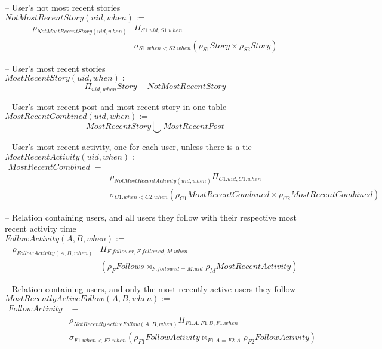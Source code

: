 \documentclass{article}
\newcommand{\var}[1]{\mathit{#1}}
\begin{document}
\begin{enumerate}
{-- User's not most recent stories \\ 
$\var{NotMostRecentStory}(uid, when) :=$
\begin{align*}
    \rho_{\var{NotMostRecentStory}(uid, when)}
    &\Pi_{S1.uid, S1.when}\\
    &\sigma_{S1.when < S2.when}
    \left( 
        \rho_{S1} \var{Story} \times \rho_{S2} \var{Story}
    \right)
\end{align*}

-- User's most recent stories \\ 
$\var{MostRecentStory}(uid, when) :=$
\[
    \Pi_{uid, when} \var{Story} - \var{NotMostRecentStory}
\]


-- User's most recent post and most recent story in one table  \\ 
$\var{MostRecentCombined}(uid, when) :=$
\[
    \var{MostRecentStory} \bigcup \var{MostRecentPost}  
\]

-- User's most recent activity, one for each user, unless there is a tie \\ 
$\var{MostRecentActivity}(uid, when) :=$
\begin{align*}
    \var{MostRecentCombined} \,\,- &\\ 
    &\rho_{\var{NotMostRecentActivity}(uid, when)} \Pi_{C1.uid, C1.when} \\
    &\sigma_{C1.when < C2.when} 
        (\rho_{C1}\var{MostRecentCombined} \times \rho_{C2}\var{MostRecentCombined})
\end{align*}


-- Relation containing users, and all users they follow with their respective most recent activity time\\
$\var{FollowActivity}(A, B, when) :=$
\begin{align*}
    \rho_{\var{FollowActivity}(A, B, when)}
    &\Pi_{F.follower, F.followed, M.when}\\ 
    &(\rho_{F} \var{Follows} \bowtie_{F.followed=M.uid} \rho_{M} \var{MostRecentActivity})
\end{align*}

-- Relation containing users, and only the most recently active users they follow\\
$\var{MostRecentlyActiveFollow}(A, B, when) :=$
\begin{align*}
    \var{FollowActivity}& \,\, -\\ 
    &\rho_{\var{NotRecentlyActiveFollow}(A,B,when)} \Pi_{F1.A, F1.B, F1.when} \\
    &\sigma_{F1.when < F2.when}
    (\rho_{F1} \var{FollowActivity} \bowtie_{F1.A=F2.A} \rho_{F2} \var{FollowActivity})
\end{align*}

}
\end{enumerate}
\end{document}

